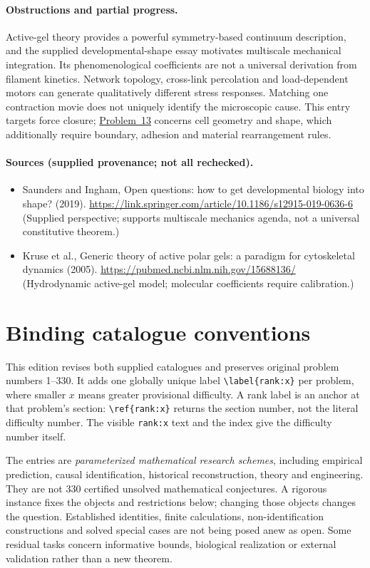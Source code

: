 \documentclass[11pt]{article}
\begin{document}
\paragraph{Obstructions and partial progress.} Active-gel theory provides a powerful symmetry-based continuum description, and the supplied developmental-shape essay motivates multiscale mechanical integration. Its phenomenological coefficients are not a universal derivation from filament kinetics. Network topology, cross-link percolation and load-dependent motors can generate qualitatively different stress responses. Matching one contraction movie does not uniquely identify the microscopic cause. This entry targets force closure; \href{https://we-solve.github.io/problems/cytoskeletal-mechanics-to-cell-shape-0a26f7ac/}{Problem~13} concerns cell geometry and shape, which additionally require boundary, adhesion and material rearrangement rules.
\paragraph{Sources (supplied provenance; not all rechecked).}
\begin{itemize}
\item Saunders and Ingham, Open questions: how to get developmental biology into shape? (2019). \url{https://link.springer.com/article/10.1186/s12915-019-0636-6} (Supplied perspective; supports multiscale mechanics agenda, not a universal constitutive theorem.)
\item Kruse et al., Generic theory of active polar gels: a paradigm for cytoskeletal dynamics (2005). \url{https://pubmed.ncbi.nlm.nih.gov/15688136/} (Hydrodynamic active-gel model; molecular coefficients require calibration.)
\end{itemize}


\section*{Binding catalogue conventions}
This edition revises both supplied catalogues and preserves original problem numbers 1--330. It adds one globally unique label \verb|\label{rank:x}| per problem, where smaller $x$ means greater provisional difficulty. A rank label is an anchor at that problem's section: \verb|\ref{rank:x}| returns the section number, not the literal difficulty number. The visible \texttt{rank:x} text and the index give the difficulty number itself.

The entries are \emph{parameterized mathematical research schemes}, including empirical prediction, causal identification, historical reconstruction, theory and engineering. They are not 330 certified unsolved mathematical conjectures. A rigorous instance fixes the objects and restrictions below; changing those objects changes the question. Established identities, finite calculations, non-identification constructions and solved special cases are not being posed anew as open. Some residual tasks concern informative bounds, biological realization or external validation rather than a new theorem.
\end{document}
